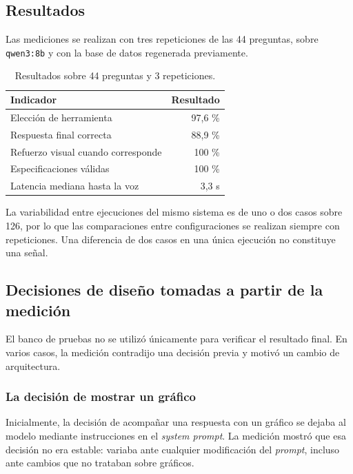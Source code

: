 \subsection{Resultados}

Las mediciones se realizan con tres repeticiones de las 44 preguntas, sobre
\texttt{qwen3:8b} y con la base de datos regenerada previamente.

\begin{table}[h]
\centering
\begin{tabular}{lr}
\toprule
\textbf{Indicador} & \textbf{Resultado} \\
\midrule
Elección de herramienta            & 97,6 \% \\
Respuesta final correcta           & 88,9 \% \\
Refuerzo visual cuando corresponde & 100 \% \\
Especificaciones válidas           & 100 \% \\
Latencia mediana hasta la voz      & 3,3 s \\
\bottomrule
\end{tabular}
\caption{Resultados sobre 44 preguntas y 3 repeticiones.}
\end{table}

La variabilidad entre ejecuciones del mismo sistema es de uno o dos casos sobre
126, por lo que las comparaciones entre configuraciones se realizan siempre con
repeticiones. Una diferencia de dos casos en una única ejecución no constituye
una señal.

\subsection{Decisiones de diseño tomadas a partir de la medición}

El banco de pruebas no se utilizó únicamente para verificar el resultado final.
En varios casos, la medición contradijo una decisión previa y motivó un cambio
de arquitectura.

\subsubsection{La decisión de mostrar un gráfico}

Inicialmente, la decisión de acompañar una respuesta con un gráfico se dejaba al
modelo mediante instrucciones en el \textit{system prompt}. La medición mostró
que esa decisión no era estable: variaba ante cualquier modificación del
\textit{prompt}, incluso ante cambios que no trataban sobre gráficos.

